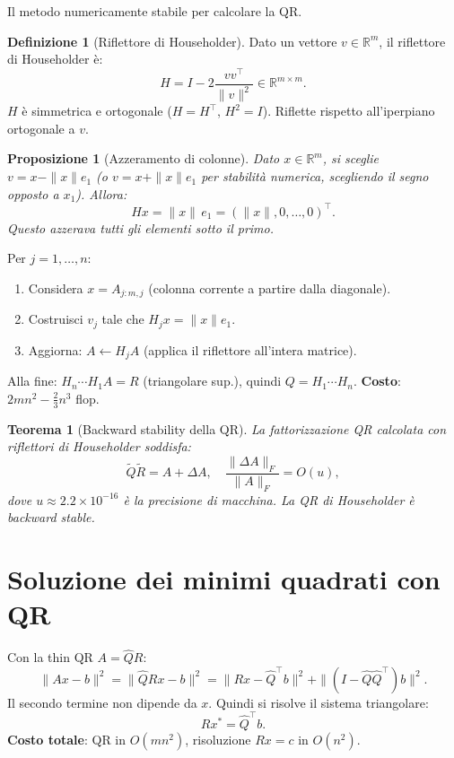 \documentclass[11pt, a4paper, twoside]{book}
\theoremstyle{definition}
\newtheorem{defn}{Definizione}[chapter]
\theoremstyle{plain}
\newtheorem{thm}{Teorema}[chapter]
\newtheorem{prop}{Proposizione}[chapter]
\theoremstyle{remark}
\newcommand{\R}{\mathbb{R}}
\begin{document}
Il metodo numericamente stabile per calcolare la QR.

\begin{defn}[Riflettore di Householder]
Dato un vettore $v \in \R^m$, il riflettore di Householder è:
\[
  H = I - 2\frac{vv^\top}{\|v\|^2} \in \R^{m \times m}.
\]
$H$ è simmetrica e ortogonale ($H = H^\top$, $H^2 = I$). Riflette rispetto all'iperpiano ortogonale a $v$.
\end{defn}

\begin{prop}[Azzeramento di colonne]
Dato $x \in \R^m$, si sceglie $v = x - \|x\|e_1$ (o $v = x + \|x\|e_1$ per stabilità numerica, scegliendo il segno opposto a $x_1$). Allora:
\[
  Hx = \|x\|\, e_1 = (\|x\|, 0, \ldots, 0)^\top.
\]
Questo azzerava tutti gli elementi sotto il primo.
\end{prop}

\begin{algobox}
Per $j = 1, \ldots, n$:
\begin{enumerate}
  \item Considera $x = A_{j:m, j}$ (colonna corrente a partire dalla diagonale).
  \item Costruisci $v_j$ tale che $H_j x = \|x\| e_1$.
  \item Aggiorna: $A \leftarrow H_j A$ (applica il riflettore all'intera matrice).
\end{enumerate}
Alla fine: $H_n \cdots H_1 A = R$ (triangolare sup.), quindi $Q = H_1 \cdots H_n$.
\textbf{Costo}: $2mn^2 - \frac{2}{3}n^3$ flop.
\end{algobox}

\begin{thm}[Backward stability della QR]
La fattorizzazione QR calcolata con riflettori di Householder soddisfa:
\[
  \tilde{Q}\tilde{R} = A + \Delta A, \quad \frac{\|\Delta A\|_F}{\|A\|_F} = O(u),
\]
dove $u \approx 2.2 \times 10^{-16}$ è la precisione di macchina. La QR di Householder è \emph{backward stable}.
\end{thm}

\section{Soluzione dei minimi quadrati con QR}

Con la thin QR $A = \hat{Q}R$:
\[
  \|Ax - b\|^2 = \|\hat{Q}Rx - b\|^2 = \|Rx - \hat{Q}^\top b\|^2 + \|(I - \hat{Q}\hat{Q}^\top)b\|^2.
\]
Il secondo termine non dipende da $x$. Quindi si risolve il sistema triangolare:
\[
  Rx^* = \hat{Q}^\top b.
\]
\textbf{Costo totale}: QR in $O(mn^2)$, risoluzione $Rx = c$ in $O(n^2)$.
\end{document}
